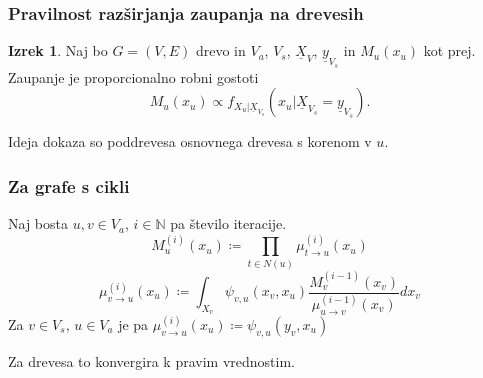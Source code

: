 \documentclass{beamer}
\renewcommand{\vec}{\underline}
\theoremstyle{definition}
\newtheorem{izrek}{Izrek}
\begin{document}
	\begin{frame}
		\frametitle{Pravilnost razširjanja zaupanja na drevesih}
		\begin{izrek}
			Naj bo $G = \left(V, E\right)$ drevo in $V_a$, $V_s$, $\vec{X}_V$,
			$\vec{y}_{V_s}$ in $M_u\left(x_u\right)$ kot prej.
			Zaupanje je proporcionalno robni gostoti
			$$
			M_u\left(x_u\right) \propto f_{X_u | \vec{X}_{V_s}}\left(x_u | \vec{X}_{V_s} = \vec{y}_{V_s}\right).
			$$
		\end{izrek}
		Ideja dokaza so poddrevesa osnovnega drevesa s korenom v $u$.
	\end{frame}

	\begin{frame}
		\frametitle{Za grafe s cikli}
		Naj bosta $u,v \in V_a$, $i \in \mathbb{N}$ pa število iteracije.
		$$
		M_u^{\left(i\right)}\left(x_u\right) \coloneqq
		\prod_{t \in N\left(u\right)}\mu^{\left(i\right)}_{t \to u}\left(x_u\right)
		$$
		$$
		\mu_{v \to u}^{\left(i\right)}\left(x_u\right) \coloneqq
		\int_{X_v} \psi_{v,u}\left(x_v,x_u\right)
		\frac{
			M_v^{\left(i-1\right)}\left(x_v\right)}{
			\mu_{u \to v}^{\left(i-1\right)}\left(x_v\right)
		}dx_v
		$$
		Za $v \in V_s$, $u \in V_a$ je pa
		$\mu_{v \to u}^{\left(i\right)}\left(x_u\right) \coloneqq \psi_{v,u}\left(y_v, x_u\right)$

		Za drevesa to konvergira k pravim vrednostim.
	\end{frame}
\end{document}
